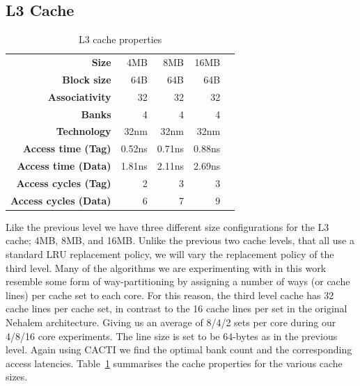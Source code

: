 \subsection{L3 Cache}
\begin{table}[ht]
\centering
\begin{tabular}{rrrrr}
\toprule
\bf{Size}                 & 4MB         & 8MB         & 16MB       \\
\bf{Block size}           & 64B         & 64B         & 64B         \\
\bf{Associativity}        & 32          & 32          & 32             \\
\bf{Banks}                & 4           & 4           & 4           \\
\bf{Technology}           & 32nm        & 32nm        & 32nm    \\
\bf{Access time (Tag)}    & 0.52ns      & 0.71ns      & 0.88ns   \\
\bf{Access time (Data)}   & 1.81ns      & 2.11ns      & 2.69ns     \\
\bf{Access cycles (Tag)}  & 2           & 3           & 3             \\
\bf{Access cycles (Data)} & 6           & 7           & 9      \\
\bottomrule
\end{tabular}
\caption{L3 cache properties}
\label{tbl:processor_model:l3}
\end{table}

Like the previous level we have three different size configurations for the L3 cache; 4MB, 8MB, and 16MB.
Unlike the previous two cache levels, that all use a standard LRU replacement policy, we will vary the replacement policy of the third level.
Many of the algorithms we are experimenting with in this work resemble some form of way-partitioning by assigning a number of ways (or cache lines) per cache set to each core.
For this reason, the third level cache has 32 cache lines per cache set, in contrast to the 16 cache lines per set in the original Nehalem architecture.
Giving us an average of 8/4/2 sets per core during our 4/8/16 core experiments.
The line size is set to be 64-bytes as in the previous level.
Again using CACTI we find the optimal bank count and the corresponding access latencies.
Table~\ref{tbl:processor_model:l3} summarises the cache properties for the various cache sizes.